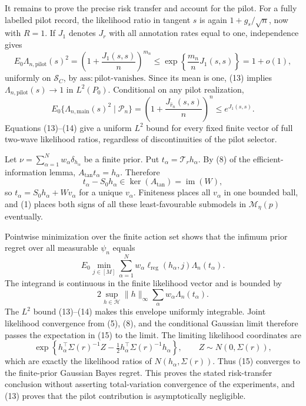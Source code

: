 It remains to prove the precise risk transfer and account for the pilot.  For a fully labelled pilot record, the likelihood ratio in tangent \(s\) is again \(1+g_s/\sqrt n\), now with \(R=1\).  If \(J_1\) denotes \(J_r\) with all annotation rates equal to one, independence gives
\[
 E_0\Lambda_{n,\mathrm{pilot}}(s)^2
 =\left(1+\frac{J_1(s,s)}n\right)^{m_n}
 \leq\exp\left\{\frac{m_n}{n}J_1(s,s)\right\}=1+o(1),             \tag{13}
\]
uniformly on \(\mathcal S_C\), by \(\mathrm{ass:pilot\text{-}vanishes}\).  Since its mean is one, (13) implies \(\Lambda_{n,\mathrm{pilot}}(s)\to1\) in \(L^2(P_0)\).  Conditional on any pilot realization,
\[
 E_0\{\Lambda_{n,\mathrm{main}}(s)^2\mid\mathscr P_n\}
 =\left(1+\frac{J_{\widehat r_n}(s,s)}n\right)^n
 \leq e^{J_1(s,s)}.                                                  \tag{14}
\]
Equations (13)--(14) give a uniform \(L^2\) bound for every fixed finite vector of full two-wave likelihood ratios, regardless of discontinuities of the pilot selector.

Let \(\nu=\sum_{\alpha=1}^Nw_\alpha\delta_{h_\alpha}\) be a finite prior.  Put \(t_\alpha=\mathcal T_rh_\alpha\).  By (8) of the efficient-information lemma, \(A_{\mathrm{tan}}t_\alpha=h_\alpha\).  Therefore
\[
 t_\alpha-S_0h_\alpha\in\ker(A_{\mathrm{tan}})=\operatorname{im}(W),
\]
so \(t_\alpha=S_0h_\alpha+Wv_\alpha\) for a unique \(v_\alpha\).  Finiteness places all \(v_\alpha\) in one bounded ball, and (1) places both signs of all these least-favourable submodels in \(\mathcal M_\eta(p)\) eventually.

Pointwise minimization over the finite action set shows that the infimum prior regret over all measurable \(\psi_n\) equals
\[
 E_0\min_{j\in[M]}\sum_{\alpha=1}^N
 w_\alpha\ell_{\mathrm{reg}}(h_\alpha,j)\Lambda_n(t_\alpha).        \tag{15}
\]
The integrand is continuous in the finite likelihood vector and is bounded by
\[
 2\sup_{h\in\mathcal H}\lVert h\rVert_\infty
 \sum_\alpha w_\alpha\Lambda_n(t_\alpha).
\]
The \(L^2\) bound (13)--(14) makes this envelope uniformly integrable.  Joint likelihood convergence from (5), (8), and the conditional Gaussian limit therefore passes the expectation in (15) to the limit.  The limiting likelihood coordinates are
\[
 \exp\left\{h_\alpha^\top\Sigma(r)^{-1}Z
 -\tfrac12h_\alpha^\top\Sigma(r)^{-1}h_\alpha\right\},\qquad
 Z\sim N(0,\Sigma(r)),                                               \tag{16}
\]
which are exactly the likelihood ratios of \(N(h_\alpha,\Sigma(r))\).  Thus (15) converges to the finite-prior Gaussian Bayes regret.  This proves the stated risk-transfer conclusion without asserting total-variation convergence of the experiments, and (13) proves that the pilot contribution is asymptotically negligible.

